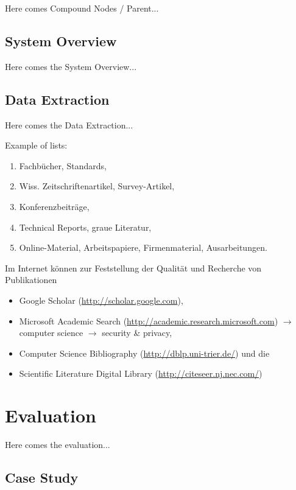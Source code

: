 \documentclass[
    fontsize=12pt,
    headings=small,
    parskip=half,           %
    bibliography=totoc,
    numbers=noenddot,       %
    open=any,               %
    ]{scrreprt}
\begin{document}
Here comes Compound Nodes / Parent...



\section{System Overview}

Here comes the System Overview...

\section{Data Extraction}

Here comes the Data Extraction...

Example of lists:

\begin{enumerate}
	\item Fachbücher, Standards,
	\item Wiss. Zeitschriftenartikel, Survey-Artikel,
	\item Konferenzbeiträge,
	\item Technical Reports, graue Literatur,
	\item Online-Material, Arbeitspapiere, Firmenmaterial, Ausarbeitungen.
\end{enumerate}

Im Internet können zur Feststellung der Qualität und Recherche von Publikationen

\begin{itemize}
	\item Google Scholar (\url{http://scholar.google.com}),
	\item Microsoft Academic Search (\href{http://academic.research.microsoft.com/?SearchDomain=2&SubDomain=2&entitytype=2}{http://academic.research.microsoft.com}) $\to$ computer science $\to$ security \& privacy,
	\item Computer Science Bibliography (\url{http://dblp.uni-trier.de/}) und die
	\item Scientific Literature Digital Library (\url{http://citeseer.nj.nec.com/})
\end{itemize}



\chapter{Evaluation}

Here comes the evaluation...

\section{Case Study}
\end{document}
